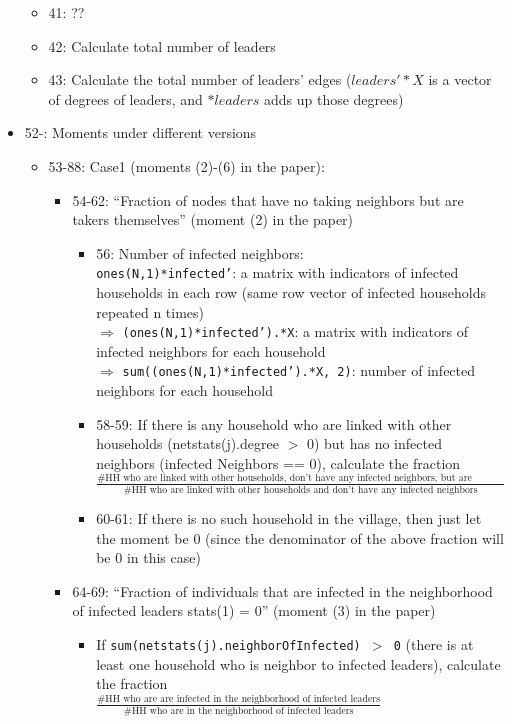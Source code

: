 \documentclass[10pt,letterpaper]{article}
\begin{document}
\begin{itemize}
\begin{itemize}
      \item 41: ??
      \item 42: Calculate total number of leaders
      \item 43: Calculate the total number of leaders' edges ($leaders'*X$ is a vector of degrees of leaders, and $*leaders$ adds up those degrees)
    \end{itemize}
  \item 52-: Moments under different versions
    \begin{itemize}
      \item 53-88: Case1 (moments (2)-(6) in the paper):
        \begin{itemize}
          \item 54-62: ``Fraction of nodes that have no taking neighbors but are takers themselves'' (moment (2) in the paper)
            \begin{itemize}
              \item 56: Number of infected neighbors: \\
                \texttt{ones(N,1)*infected'}: a matrix with indicators of infected households in each row (same row vector of infected households repeated n times)\\
                $\Rightarrow$ \texttt{(ones(N,1)*infected').*X}: a matrix with indicators of infected neighbors for each household \\
                $\Rightarrow$ \texttt{sum((ones(N,1)*infected').*X, 2)}: number of infected neighbors for each household
              \item 58-59: If there is any household who are linked with other households (netstats(j).degree $>$ 0) but has no infected neighbors (infected Neighbors == 0), 
                calculate the fraction $\frac{\text{\# HH who are linked with other households, don't have any infected neighbors, but are infected themselves}}{\text{\# HH who are linked with other households and don't have any infected neighbors}}$
              \item 60-61: If there is no such household in the village, then just let the moment be $0$ (since the denominator of the above fraction will be $0$ in this case)
            \end{itemize}
          \item 64-69: ``Fraction of individuals that are infected in the neighborhood of infected leaders stats(1) = 0'' (moment (3) in the paper)
            \begin{itemize}
              \item If \texttt{sum(netstats(j).neighborOfInfected) $>$ 0} (there is at least one household who is neighbor to infected leaders), calculate the fraction \\ $\frac{\text{\# HH who are are infected in the neighborhood of infected leaders}}{\text{\# HH who are in the neighborhood of infected leaders}}$

\end{itemize}
\end{itemize}
\end{itemize}
\end{itemize}
\end{document}
